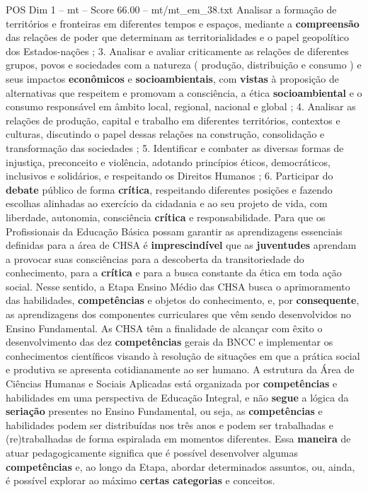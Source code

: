 \begin{textsample}{POS Dim 1 – mt – Score 66.00 – mt/mt\_em\_38.txt}
Analisar a formação de territórios e fronteiras em diferentes tempos e espaços, mediante a \textbf{compreensão} das relações de poder que determinam as territorialidades e o papel geopolítico dos Estados-nações ; 3.
Analisar e avaliar criticamente as relações de diferentes grupos, povos e sociedades com a natureza ( produção, distribuição e consumo ) e seus impactos \textbf{econômicos} e \textbf{socioambientais}, com \textbf{vistas} à proposição de alternativas que respeitem e promovam a consciência, a ética \textbf{socioambiental} e o consumo responsável em âmbito local, regional, nacional e global ; 4.
Analisar as relações de produção, capital e trabalho em diferentes territórios, contextos e culturas, discutindo o papel dessas relações na construção, consolidação e transformação das sociedades ; 5.
Identificar e combater as diversas formas de injustiça, preconceito e violência, adotando princípios éticos, democráticos, inclusivos e solidários, e respeitando os Direitos Humanos ; 6.
Participar do \textbf{debate} público de forma \textbf{crítica}, respeitando diferentes posições e fazendo escolhas alinhadas ao exercício da cidadania e ao seu projeto de vida, com liberdade, autonomia, consciência \textbf{crítica} e responsabilidade.
Para que os Profissionais da Educação Básica possam garantir as aprendizagens essenciais definidas para a área de CHSA é \textbf{imprescindível} que as \textbf{juventudes} aprendam a provocar suas consciências para a descoberta da transitoriedade do conhecimento, para a \textbf{crítica} e para a busca constante da ética em toda ação social.
Nesse sentido, a Etapa Ensino Médio das CHSA busca o aprimoramento das habilidades, \textbf{competências} e objetos do conhecimento, e, por \textbf{consequente}, as aprendizagens dos componentes curriculares que vêm sendo desenvolvidos no Ensino Fundamental.
As CHSA têm a finalidade de alcançar com êxito o desenvolvimento das dez \textbf{competências} gerais da BNCC e implementar os conhecimentos científicos visando à resolução de situações em que a prática social e produtiva se apresenta cotidianamente ao ser humano.
A estrutura da Área de Ciências Humanas e Sociais Aplicadas está organizada por \textbf{competências} e habilidades em uma perspectiva de Educação Integral, e não \textbf{segue} a lógica da \textbf{seriação} presentes no Ensino Fundamental, ou seja, as \textbf{competências} e habilidades podem ser distribuídas nos três anos e podem ser trabalhadas e (re)trabalhadas de forma espiralada em momentos diferentes.
Essa \textbf{maneira} de atuar pedagogicamente significa que é possível desenvolver algumas \textbf{competências} e, ao longo da Etapa, abordar determinados assuntos, ou, ainda, é possível explorar ao máximo \textbf{certas} \textbf{categorias} e conceitos.

\end{textsample}
